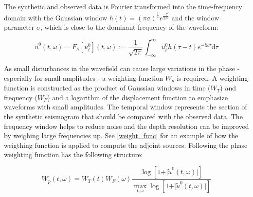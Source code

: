 The synthetic and observed data is Fourier transformed into the time-frequency domain with the Gaussian window
$h(t) = (\pi \sigma)^{\frac{1}{4}} e^{\frac{-t^2}{2 \sigma^2}}$
and the window parameter $\sigma$, which is close to the dominant frequency of the waveform:

\begin{equation}
\tilde{u}^0 (t, \omega) = F_h[u_i^0](t,\omega) := \frac{1}{\sqrt{2\pi}} \int_{-\infty}^{\infty} u_i^0 h(\tau - t) e^{-i \omega \tau} \mathrm{d}\tau
\end{equation}


As small disturbances in the wavefield can cause large variations in the phase - especially for small amplitudes -
a weighting function $W_p$ is required.
%
A weighting function is constructed as the product of Gaussian windows in time ($W_T$) and frequency ($W_F$) 
and a logarithm of the displacement function to emphasize waveforms with small amplitudes.
The temporal window represents the section of the synthetic seismogram that should be compared with the 
observed data. 
The frequency window helps to reduce noise and the depth resolution can be improved by weighing large frequencies up.
See \autoref{weight_func} for an example of how the weigthing function is applied to compute the adjoint sources.
Following \citealp{Fichtner2009} the phase weighting function has the following structure:

\begin{equation}
W_p(t, \omega) = W_T(t) W_F(\omega) \frac{  \log[1 + \vert \tilde{u}^0 (t, \omega) \vert ] }
{\max_{t,\omega} \log  [1 + \vert \tilde{u}^0 (t, \omega) \vert ]}
\end{equation}





